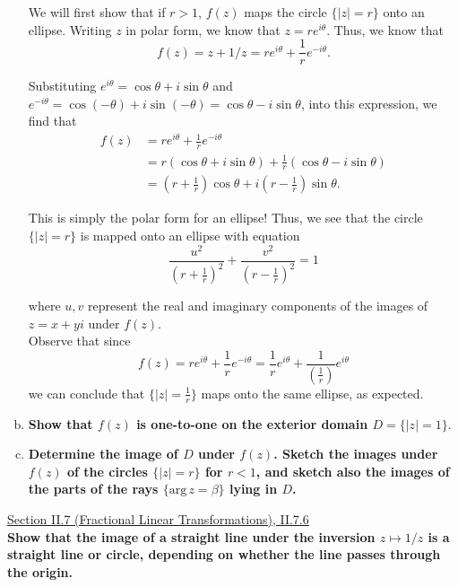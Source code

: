 \documentclass[11pt]{article}
\theoremstyle{definition}
\begin{document}
\begin{enumerate}[a)]
    We will first show that if $r > 1$, $f(z)$ maps the circle $\{|z| = r\}$ onto an ellipse. Writing $z$ in polar form, we know that $z=re^{i\theta}.$ Thus, we know that
    \[f(z) = z + 1/z = re^{i\theta} + \frac{1}{r}e^{-i\theta}.\]

    Substituting $e^{i\theta} = \cos\theta + i\sin \theta$ and $e^{-i\theta} = \cos(-\theta) + i\sin(-\theta) = \cos \theta - i\sin\theta$, into this expression, we find that
    \begin{align*} f(z) &= re^{i\theta} + \frac{1}{r}e^{-i\theta} \\
    &= r\left(\cos\theta + i\sin \theta \right) + \frac{1}{r}\left( \cos \theta - i\sin\theta\right) \\
    &= \left( r + \frac{1}{r} \right) \cos \theta + i \left(r - \frac{1}{r}\right) \sin \theta.\end{align*}
    
    This is simply the polar form for an ellipse! Thus, we see that the circle $\{|z| = r\}$ is mapped onto an ellipse with equation 
    \[ \frac{u^2}{\left(r + \frac{1}{r}\right)^2} + \frac{v^2}{\left(r - \frac{1}{r}\right)^2} = 1\]

    where $u, v$ represent the real and imaginary components of the images of $z = x+yi$ under $f(z)$. \\

    Observe that since 
    \[ f(z) = re^{i\theta} + \frac{1}{r}e^{-i\theta} = \frac{1}{r} e^{i\theta} + \frac{1}{\left(\frac{1}{r}\right)}e^{i\theta} \]
    we can conclude that $\{|z| = \frac{1}{r} \}$ maps onto the same ellipse, as expected.  \\

\item \textbf{Show that $f(z)$ is one-to-one on the exterior domain $D = \{|z| = 1\}.$}

\item \textbf{Determine the image of $D$ under $f(z)$. Sketch the images under $f(z)$ of the circles $\{|z| = r\}$ for $r < 1$, and sketch also the images of the parts of the rays $\{\mathrm{arg} \, z = \beta \}$ lying in $D$.}

\end{enumerate}
\newpage

\underline{Section II.7 (Fractional Linear Transformations), II.7.6} \\

\textbf{Show that the image of a straight line under the inversion $z \mapsto 1/z$ is a straight line or circle, depending on whether the line passes through the origin.} \\
\end{document}
